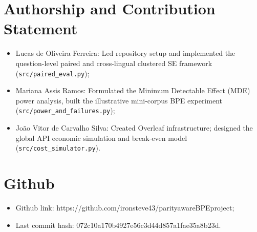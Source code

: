 \documentclass[sigconf,nonacm]{acmart}
\begin{document}
\section*{Authorship and Contribution Statement}

\begin{itemize}[leftmargin=*, itemsep=2pt, topsep=2pt]
    \item {Lucas de Oliveira Ferreira:}
    Led repository setup and implemented the question-level paired and cross-lingual clustered SE framework (\texttt{src/\allowbreak paired\_\allowbreak eval.py});

    \item {Mariana Assis Ramos:}
    Formulated the Minimum Detectable Effect (MDE) power analysis, built the illustrative mini-corpus BPE experiment (\texttt{src/\allowbreak power\_\allowbreak and\_\allowbreak failures.py});

    \item {João Vitor de Carvalho Silva:}
    Created Overleaf infrastructure; designed the global API economic simulation and break-even model (\texttt{src/\allowbreak cost\_\allowbreak simulator.py}).
\end{itemize}

\section*{Github}
\begin{itemize}[leftmargin=*, itemsep=2pt, topsep=2pt]
    \item {Github link:}
    https://github.com/ironsteve43/parityawareBPEproject;

    \item {Last commit hash:}
    072c10a170b4927e56c3d44d857a1fae35a8b23d.

\end{itemize}



\end{document}
